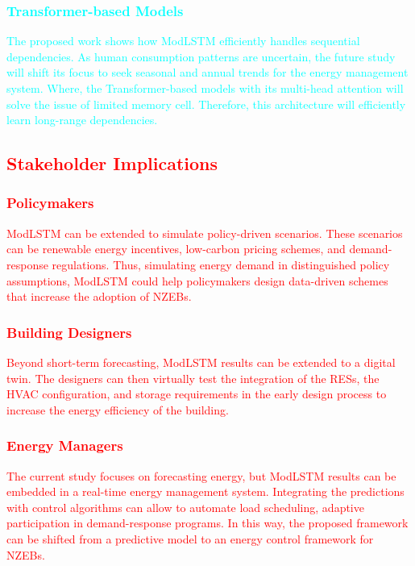 \documentclass[journal]{IEEEtran}
\begin{document}
\subsubsection{\textcolor{cyan}{{Transformer-based Models}}}
\textcolor{cyan}{ The proposed work shows how ModLSTM efficiently handles sequential dependencies. As human consumption patterns are uncertain, the future study will shift its focus to seek seasonal and annual trends for the energy management system. Where, the Transformer-based models with its multi-head attention will solve the issue of limited memory cell. Therefore, this architecture will efficiently learn long-range dependencies.}
\vspace{0.5em}
\textcolor{red}{\subsection{Stakeholder Implications}
\subsubsection{Policymakers} ModLSTM can be extended to simulate policy-driven scenarios. These scenarios can be renewable energy incentives, low-carbon pricing schemes, and demand-response regulations. Thus, simulating energy demand in distinguished policy assumptions, ModLSTM could help policymakers design data-driven schemes that increase the adoption of NZEBs.
\subsubsection{Building Designers} Beyond short-term forecasting, ModLSTM results can be extended to a digital twin. The designers can then virtually test the integration of the RESs, the HVAC configuration, and storage requirements in the early design process to increase the energy efficiency of the building.
\subsubsection{Energy Managers} The current study focuses on forecasting energy, but ModLSTM results can be embedded in a real-time energy management system. Integrating the predictions with control algorithms can allow to automate load scheduling, adaptive participation in demand-response programs. In this way, the proposed framework can be shifted from a predictive model to an energy control framework for NZEBs.}
\end{document}
